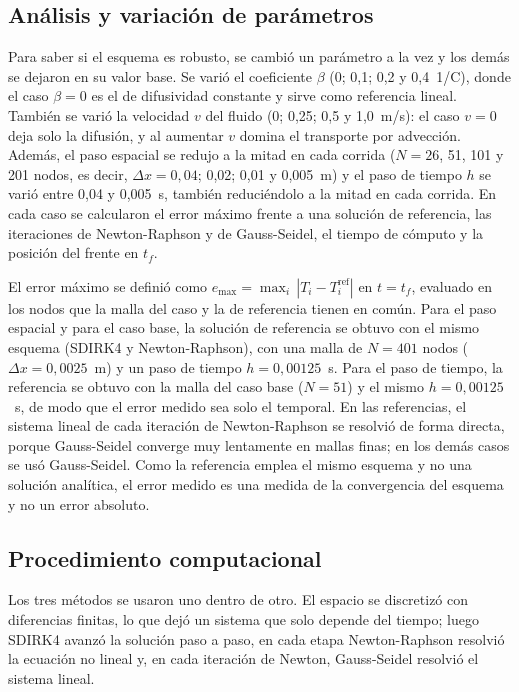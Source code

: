 \documentclass[final,5p,times,twocolumn,authoryear,11pt]{elsarticle}
\begin{document}
\subsection{Análisis y variación de parámetros}

Para saber si el esquema es robusto, se cambió un parámetro a la vez y los demás se dejaron en su valor base. Se varió el coeficiente $\beta$ (0; 0,1; 0,2 y 0,4~1/\textdegree C), donde el caso $\beta=0$ es el de difusividad constante y sirve como referencia lineal. También se varió la velocidad $v$ del fluido (0; 0,25; 0,5 y 1,0~m/s): el caso $v=0$ deja solo la difusión, y al aumentar $v$ domina el transporte por advección. Además, el paso espacial se redujo a la mitad en cada corrida ($N=26$, 51, 101 y 201 nodos, es decir, $\Delta x=0{,}04$; 0,02; 0,01 y 0,005~m) y el paso de tiempo $h$ se varió entre 0,04 y 0,005~s, también reduciéndolo a la mitad en cada corrida. En cada caso se calcularon el error máximo frente a una solución de referencia, las iteraciones de Newton-Raphson y de Gauss-Seidel, el tiempo de cómputo y la posición del frente en $t_f$.

El error máximo se definió como $e_{\max}=\max_i\,|T_i-T_i^{\mathrm{ref}}|$ en $t=t_f$, evaluado en los nodos que la malla del caso y la de referencia tienen en común. Para el paso espacial y para el caso base, la solución de referencia se obtuvo con el mismo esquema (SDIRK4 y Newton-Raphson), con una malla de $N=401$ nodos ($\Delta x=0{,}0025$~m) y un paso de tiempo $h=0{,}00125$~s. Para el paso de tiempo, la referencia se obtuvo con la malla del caso base ($N=51$) y el mismo $h=0{,}00125$~s, de modo que el error medido sea solo el temporal. En las referencias, el sistema lineal de cada iteración de Newton-Raphson se resolvió de forma directa, porque Gauss-Seidel converge muy lentamente en mallas finas; en los demás casos se usó Gauss-Seidel. Como la referencia emplea el mismo esquema y no una solución analítica, el error medido es una medida de la convergencia del esquema y no un error absoluto.

\subsection{Procedimiento computacional}

Los tres métodos se usaron uno dentro de otro. El espacio se discretizó con diferencias finitas, lo que dejó un sistema que solo depende del tiempo; luego SDIRK4 avanzó la solución paso a paso, en cada etapa Newton-Raphson resolvió la ecuación no lineal y, en cada iteración de Newton, Gauss-Seidel resolvió el sistema lineal.
\end{document}
